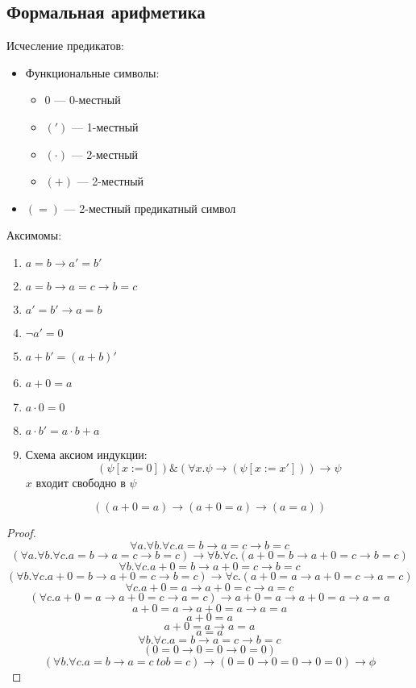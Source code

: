 \documentclass[english]{article}
\begin{document}
\subsection{Формальная арифметика}
\label{sec:org37b9561}
\begin{definition}
	Исчесление предикатов:
	\begin{itemize}
		\item Функциональные символы:
		      \begin{itemize}
			      \item \(0\) --- 0-местный
			      \item \((')\) --- 1-местный
			      \item \((\cdot)\) --- 2-местный
			      \item \((+)\) --- 2-местный
		      \end{itemize}
		\item \((=)\) --- 2-местный предикатный символ
	\end{itemize}
	Аксимомы:
	\begin{enumerate}
		\item \(a = b \to a' = b'\)
		\item \(a = b \to a = c \to b = c\)
		\item \(a' = b' \to a= b\)
		\item \(\neg a' = 0\)
		\item \(a + b' = (a + b)'\)
		\item \(a + 0 = a\)
		\item \(a\cdot 0 = 0\)
		\item \(a\cdot b' = a\cdot b + a\)
		\item Схема аксиом индукции:
		      \[ (\psi[x:=0])\&(\forall x. \psi \to (\psi[x:=x'])) \to \psi \]
		      \(x\) входит свободно в \(\psi\)
	\end{enumerate}
\end{definition}
\beginproperty
\begin{property}
	\[ ((a + 0 = a) \to (a + 0 = a) \to (a = a)) \]
\end{property}
\begin{proof}
	\[ \forall a. \forall b. \forall c. a = b \to a = c \to b = c \]
	\[ (\forall a. \forall b. \forall c. a = b \to a = c \to b = c) \to \forall b. \forall c. (a + 0 = b \to a + 0 = c \to b = c) \]
	\[ \forall b. \forall c. a + 0 = b \to a + 0 = c\to b = c \]
	\[ (\forall b. \forall c. a + 0 = b \to a + 0 = c \to b = c) \to \forall c.(a + 0 = a \to a + 0 = c \to a=c) \]
	\[ \forall c. a + 0 = a \to a + 0 = c \to a = c \]
	\[ (\forall c. a + 0 = a \to a + 0 = c \to a = c) \to a+0 = a \to a + 0 = a \to a= a \]
	\[ a + 0  = a \to a + 0 = a \to a = a \]
	\[ a + 0 = a \]
	\[ a + 0 = a \to a = a \]
	\[ a = a \]
	\[ \forall b. \forall c. a = b \to a = c \to b = c \]
	\[ (0 = 0 \to 0 = 0 \to 0 = 0) \]
	\[ (\forall b. \forall c. a = b \to a = c\ to b = c) \to (0 = 0 \to 0 = 0 \to 0 = 0) \to \phi \]
	\fixme
\end{proof}
\end{document}
